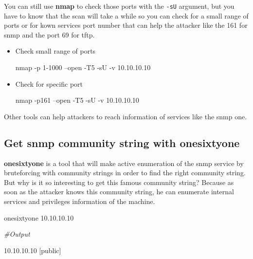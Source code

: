 \documentclass{assets/ipesethesis}
\newenvironment{Shaded}{\begin{snugshade}}{\end{snugshade}}
\newcommand{\CommentTok}[1]{\textcolor[rgb]{0.56,0.35,0.01}{\textit{#1}}}
\newcommand{\ExtensionTok}[1]{#1}
\newcommand{\FunctionTok}[1]{\textcolor[rgb]{0.00,0.00,0.00}{#1}}
\newcommand{\NormalTok}[1]{#1}
\begin{document}
You can still use \textbf{nmap} to check those ports with the \texttt{-sU} argument, but you have to know that the scan will take a while so you can check for a small range of ports or for
kown services port number that can help the attacker like the 161 for snmp and the port 69 for tftp.

\begin{itemize}
\item
  Check small range of ports

\begin{Shaded}
\begin{Highlighting}[]
\FunctionTok{nmap}\NormalTok{ -p 1-1000 --open -T5 -sU -v 10.10.10.10}
\end{Highlighting}
\end{Shaded}
\item
  Check for specific port

\begin{Shaded}
\begin{Highlighting}[]
\FunctionTok{nmap}\NormalTok{ -p161 --open -T5 -sU -v 10.10.10.10}
\end{Highlighting}
\end{Shaded}
\end{itemize}

Other tools can help attackers to reach information of services like the snmp one.

\hypertarget{get-snmp-community-string-with-onesixtyone}{%
\subsection*{Get snmp community string with onesixtyone}\label{get-snmp-community-string-with-onesixtyone}}

\textbf{onesixtyone} is a tool that will make active enumeration of the snmp service by bruteforcing with community strings in order to find the right community string.
But why is it so interesting to get this famous community string? Because as soon as the attacker knows this community string, he can enumerate internal services and
privileges information of the machine.

\begin{Shaded}
\begin{Highlighting}[]
\ExtensionTok{onesixtyone}\NormalTok{ 10.10.10.10}

\CommentTok{#Output}

\ExtensionTok{10.10.10.10}\NormalTok{ [public]}
\end{Highlighting}
\end{Shaded}
\end{document}
